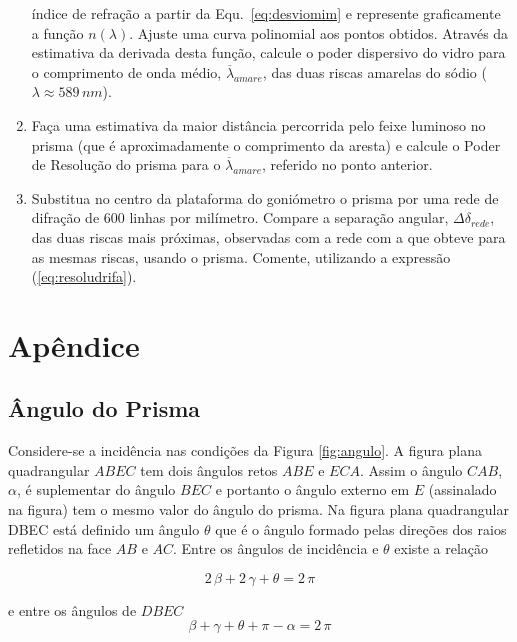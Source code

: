 \documentclass[a4paper,12pt]{article}  %
\begin{document}
\begin{enumerate}
índice de refração a partir da Equ.~\ref{eq:desviomim} e represente  graficamente a função $n(\lambda)$. Ajuste uma curva polinomial aos pontos obtidos. Através da  estimativa da derivada desta função, calcule o poder dispersivo do vidro para o comprimento de onda médio, $\overline{\lambda}_{amare}$, das 
duas riscas amarelas do sódio ($\lambda \approx 589\,nm$). 
\item Faça uma estimativa da maior distância percorrida pelo feixe luminoso no prisma (que é aproximadamente o comprimento da aresta) e calcule 
  o  Poder  de  Resolução  do  prisma  para  o  $\overline{\lambda}_{amare}$, referido  no  ponto  anterior. 
\item Substitua no centro da plataforma do goniómetro o prisma por uma rede de difração de 
600 linhas por milímetro. Compare a separação angular, $\Delta \delta_{rede}$, das duas riscas mais próximas, 
observadas  com  a  rede  com  a  que  obteve  para  as  mesmas  riscas,  usando  o  prisma. 
Comente, utilizando a expressão (\ref{eq:resoludrifa}). 

\end{enumerate}

\section*{\sf Apêndice}
\subsection*{\sf Ângulo do Prisma}

Considere-se a incidência nas condições da Figura \ref{fig:angulo}.
A figura plana quadrangular $ABEC$ tem dois ângulos retos $ABE$ e $ECA$. Assim o ângulo $CAB$, $\alpha$, é suplementar do ângulo $BEC$ e portanto o ângulo externo em $E$ (assinalado na figura) tem o mesmo valor do ângulo do prisma.
Na figura plana quadrangular DBEC está definido um ângulo $θ$ que é o ângulo formado pelas direções dos raios refletidos na face $AB$ e $AC$. 
Entre os ângulos de incidência e $θ$ existe a relação 

 \begin{equation}
	\label{eq:soma}
	2\, \beta  + 2 \, \gamma + \theta = 2 \, \pi
\end{equation}

e entre os ângulos de $DBEC$ 
 \begin{equation}
	\label{eq:soma2}
	\beta  +  \gamma + \theta  + \pi - \alpha= 2 \, \pi
\end{equation}
\end{document}
